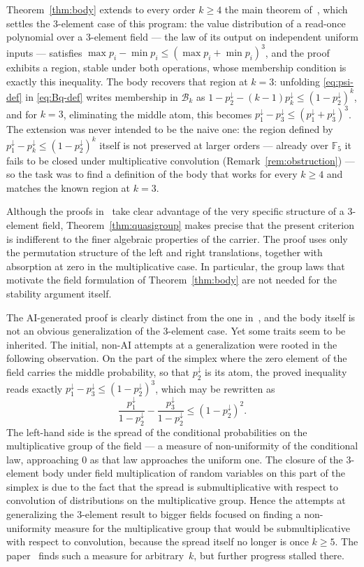 \documentclass[11pt]{article}
\theoremstyle{definition}
\theoremstyle{remark}
\newcommand{\F}{\mathbb{F}}
\newcommand{\body}{\mathcal{B}}
\newcommand{\down}{\downarrow}
\begin{document}
Theorem~\ref{thm:body} extends to every order $k\ge4$ the main theorem
of~\cite{yashunsky2021}, which settles the 3-element case of this
program: the value distribution of a read-once polynomial over a
3-element field --- the law of its output on independent uniform
inputs --- satisfies
$\max p_i - \min p_i \le (\max p_i + \min p_i)^3$, and the proof
exhibits a region, stable under both operations, whose membership
condition is exactly this inequality.  The body recovers that region at
$k=3$: unfolding \eqref{eq:psi-def} in \eqref{eq:Bq-def} writes
membership in $\body_k$ as
$1-p_2^\down-(k-1)p_k^\down\le(1-p_2^\down)^k$, and for $k=3$,
eliminating the middle atom, this becomes
$p_1^\down - p_3^\down \le (p_1^\down + p_3^\down)^3$.  The extension
was never intended to be the naive one: the region defined by
$p_1^\down-p_k^\down\le(1-p_2^\down)^k$ itself is not preserved at
larger orders --- already over $\F_5$ it fails to be closed under
multiplicative convolution (Remark~\ref{rem:obstruction}) --- so the
task was to find a definition of the body that works for every
$k\ge4$ and matches the known region at $k=3$.

Although the proofs in~\cite{yashunsky2021} take clear advantage of the
very specific structure of a 3-element field, Theorem~\ref{thm:quasigroup}
makes precise that the present criterion is indifferent to the finer
algebraic properties of the carrier.  The proof uses only the permutation
structure of the left and right translations, together with absorption at
zero in the multiplicative case.  In particular, the group laws that
motivate the field formulation of Theorem~\ref{thm:body} are not needed for
the stability argument itself.

The AI-generated proof is clearly distinct from the one
in~\cite{yashunsky2021}, and the body itself is not an obvious
generalization of the 3-element case.  Yet some traits seem to be
inherited.  The initial, non-AI attempts at a generalization were
rooted in the following observation.  On the part of the simplex where
the zero element of the field carries the middle probability, so that
$p_2^\down$ is its atom, the proved inequality reads exactly
$p_1^\down - p_3^\down \le (1-p_2^\down)^3$, which may be rewritten as
\begin{equation}\label{eq:3elem-ineq}
\frac{p_1^\down}{1-p_2^\down} - \frac{p_3^\down}{1-p_2^\down}
\le (1-p_2^\down)^2 .
\end{equation}
The left-hand side is the spread of the conditional probabilities on
the multiplicative group of the field --- a measure of non-uniformity
of the conditional law, approaching $0$ as that law approaches the
uniform one.  The closure of the 3-element body under field
multiplication of random variables on this part of the simplex is due
to the fact that the spread is submultiplicative with respect to
convolution of distributions on the multiplicative group.  Hence the
attempts at generalizing the 3-element result to bigger fields focused
on finding a non-uniformity measure for the multiplicative group that
would be submultiplicative with respect to convolution, because the
spread itself no longer is once $k\ge5$.  The
paper~\cite{yashunsky2024} finds such a measure for arbitrary~$k$, but
further progress stalled there.
\end{document}
